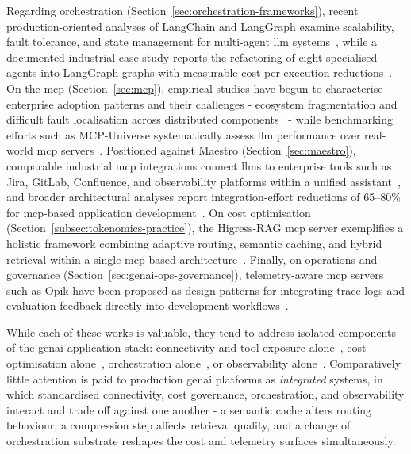 Regarding orchestration (Section~\ref{sec:orchestration-frameworks}), recent production-oriented analyses of LangChain and LangGraph examine scalability, fault tolerance, and state management for multi-agent \gls{llm} systems~\cite{jddi2025langgraph}, while a documented industrial case study reports the refactoring of eight specialised agents into LangGraph graphs with measurable cost-per-execution reductions~\cite{frenxt2026langgraph}. On the \gls{mcp} (Section~\ref{sec:mcp}), empirical studies have begun to characterise enterprise adoption patterns and their challenges - ecosystem fragmentation and difficult fault localisation across distributed components~\cite{chen2026mcpadoption} - while benchmarking efforts such as MCP-Universe systematically assess \gls{llm} performance over real-world \gls{mcp} servers~\cite{luo2025mcpuniverse}. Positioned against Maestro (Section~\ref{sec:maestro}), comparable industrial \gls{mcp} integrations connect \glspl{llm} to enterprise tools such as Jira, GitLab, Confluence, and observability platforms within a unified assistant~\cite{gupta2025bridgingai}, and broader architectural analyses report integration-effort reductions of 65--80\% for \gls{mcp}-based application development~\cite{shamus2025mcpanalysis}. On cost optimisation (Section~\ref{subsec:tokenomics-practice}), the Higress-RAG \gls{mcp} server exemplifies a holistic framework combining adaptive routing, semantic caching, and hybrid retrieval within a single \gls{mcp}-based architecture~\cite{lin2026higressrag}. Finally, on operations and governance (Section~\ref{sec:genai-ops-governance}), telemetry-aware \gls{mcp} servers such as Opik have been proposed as design patterns for integrating trace logs and evaluation feedback directly into development workflows~\cite{koc2025mindmetrics}.

While each of these works is valuable, they tend to address isolated components of the \gls{genai} application stack: connectivity and tool exposure alone~\cite{chen2026mcpadoption,luo2025mcpuniverse,gupta2025bridgingai}, cost optimisation alone~\cite{lin2026higressrag}, orchestration alone~\cite{jddi2025langgraph,frenxt2026langgraph}, or observability alone~\cite{koc2025mindmetrics}. Comparatively little attention is paid to production \gls{genai} platforms as \emph{integrated} systems, in which standardised connectivity, cost governance, orchestration, and observability interact and trade off against one another - a semantic cache alters routing behaviour, a compression step affects retrieval quality, and a change of orchestration substrate reshapes the cost and telemetry surfaces simultaneously.

